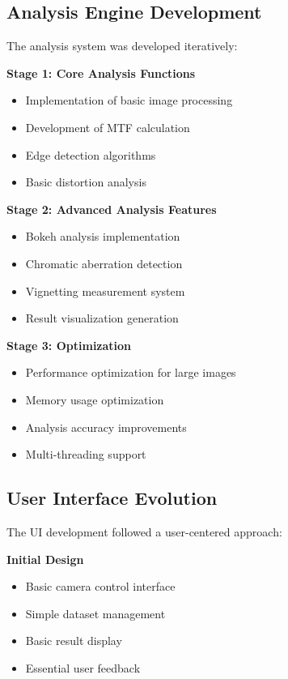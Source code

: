 \subsection{Analysis Engine Development}
The analysis system was developed iteratively:

\textbf{Stage 1: Core Analysis Functions}
\begin{itemize}
    \item Implementation of basic image processing
    \item Development of MTF calculation
    \item Edge detection algorithms
    \item Basic distortion analysis
\end{itemize}

\textbf{Stage 2: Advanced Analysis Features}
\begin{itemize}
    \item Bokeh analysis implementation
    \item Chromatic aberration detection
    \item Vignetting measurement system
    \item Result visualization generation
\end{itemize}

\textbf{Stage 3: Optimization}
\begin{itemize}
    \item Performance optimization for large images
    \item Memory usage optimization
    \item Analysis accuracy improvements
    \item Multi-threading support
\end{itemize}

\subsection{User Interface Evolution}
The UI development followed a user-centered approach:

\textbf{Initial Design}
\begin{itemize}
    \item Basic camera control interface
    \item Simple dataset management
    \item Basic result display
    \item Essential user feedback
\end{itemize}

